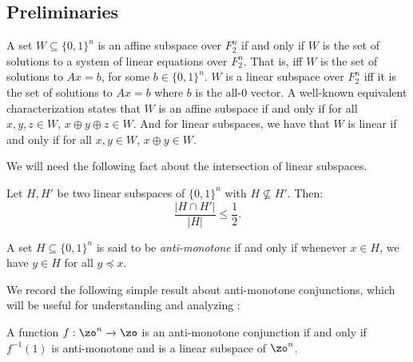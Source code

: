 \documentclass[11pt]{article}
\theoremstyle{definition}
\begin{document}
\subsection{Preliminaries}
\begin{definition}[Subspaces]  \label{def:affine-subspace}
A set $W \subseteq \{0,1\}^n$ is an affine subspace over $F_2^n$ if and only if $W$ is the set of solutions to a system of linear equations over $F_2^n$. That is, iff $W$ is the set of solutions to $Ax=b$, for some $b \in \{0,1\}^n$. 
$W$ is a linear subspace  over $F_2^n$ iff it is the set of solutions to $Ax=b$ where $b$ is the all-0 vector.
A well-known equivalent characterization states that $W$ is an affine subspace if and only if for all $x,y,z \in W$, $x \oplus y \oplus z \in W$.
And for linear subspaces, we have that $W$ is linear if and only if for all $x,y \in W$, $x \oplus y \in W$.
\end{definition}

We will need the following fact about the intersection of linear subspaces. 



\begin{fact}\label{claim:PRS-15}
    Let $H, H'$ be two linear subspaces of $\{0,1\}^n$ with $H \not \subseteq H'$. Then: 
    \[\frac{|H \cap H'|}{ |H| } \leq \frac{1}{2}.\]
\end{fact}

\begin{definition}
A set $H \subseteq \{0,1\}^n$ is said to be \emph{anti-monotone} if and only if whenever $x \in H$, we have $y \in H$ for all $y \preceq x$. 
\end{definition}

We record the following simple result about anti-monotone conjunctions, which will be useful for understanding and analyzing :

 \begin{lemma}\label{lem: monotone conj characterization}
     A function $f: \zo^n \to \zo$ is an anti-monotone conjunction if and only if $f^{-1}(1)$ is anti-monotone and is a linear subspace of $\zo^n$. 
 \end{lemma}
\end{document}
